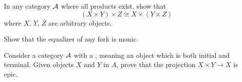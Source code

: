 \begin{problem}
	In any category $\AA$ where all products exist,
	show that \[ (X \times Y) \times Z \cong X \times (Y \times Z) \]
	where $X$, $Y$, $Z$ are arbitrary objects.
	\label{prob:associative_product}
\end{problem}

\begin{sproblem}
	Show that the equalizer of any fork is monic.
\end{sproblem}

\begin{problem}
	\gim
	Consider a category $\AA$ with a ,
	meaning an object which is both initial and terminal. 
	Given objects $X$ and $Y$ in $A$, prove that the projection $X \times Y \to X$ is epic.
\end{problem}

